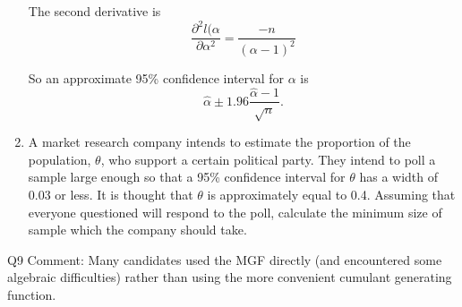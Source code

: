 \documentclass[a4paper,12pt]{article}
\begin{document}
\begin{enumerate}
The second derivative is
\[ \frac{\partial^2 l(\alpha}{ \partial \alpha^2} = \frac{-n}{(\alpha -1)^2} \]

So an approximate 95\% confidence interval for $\alpha$ is 
\[ \hat{\alpha} \pm  1.96 \frac{\hat{\alpha} - 1}{\sqrt{n}} .\]

\newpage
\item A market research company intends to estimate the proportion of the population, $\theta$, who support a certain political party. They intend to poll a sample large enough so that a 95\% confidence interval for $\theta$ has a width of 0.03 or less. It is thought that $\theta$ is approximately equal to 0.4.
Assuming that everyone questioned will respond to the poll, calculate the minimum size of sample which the company should take. 
\end{enumerate}
Q9 Comment: Many candidates used the MGF directly (and encountered some
algebraic difficulties) rather than using the more convenient cumulant generating
function.
\newpage %
\end{document}
